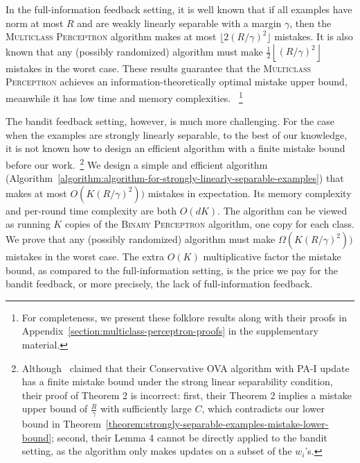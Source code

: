 In the full-information feedback setting, it is well known
\citep{Crammer-Singer-2003} that if all examples have norm at most $R$ and are
weakly linearly separable with a margin $\gamma$, then the \textsc{Multiclass
Perceptron} algorithm makes at most $\lfloor 2(R/\gamma)^2 \rfloor$ mistakes.
It is also known that any (possibly randomized) algorithm must
make $\frac{1}{2} \left\lfloor (R/\gamma)^2 \right \rfloor$ mistakes in the
worst case.
These results guarantee that the \textsc{Multiclass Perceptron} achieves an
information-theoretically optimal mistake upper bound, meanwhile it has
low time and memory complexities.%
~\footnote{
For completeness, we present these 
folklore
results along
with their proofs in Appendix~\ref{section:multiclass-perceptron-proofs} in the
supplementary material.}

The bandit feedback setting, however, is much more challenging. For the case
when the examples are strongly linearly separable, to the best of our knowledge,
it is not known how to design an efficient algorithm with a finite mistake bound
before our work.~\footnote{Although~\cite{Chen-Chen-Zhang-Chen-Zhang-2009}
claimed that their Conservative OVA algorithm with PA-I update has a finite
mistake bound under the strong linear separability condition, their proof of
Theorem 2 is incorrect: first, their Theorem 2
implies a mistake upper bound of $\frac{R}{\gamma}$ with
sufficiently large $C$, which contradicts our lower
bound in Theorem~\ref{theorem:strongly-separable-examples-mistake-lower-bound};
second, their Lemma 4 cannot be directly applied to the bandit
setting, as the algorithm only makes updates on a subset of the $w_i$'s.} We
design a simple and efficient algorithm
(Algorithm~\ref{algorithm:algorithm-for-strongly-linearly-separable-examples})
that makes at most $O(K (R/\gamma)^2))$ mistakes in expectation. Its memory
complexity and per-round time complexity are both $O(dK)$. The algorithm can be
viewed as running $K$ copies of the \textsc{Binary Perceptron} algorithm, one
copy for each class. We prove that any (possibly randomized) algorithm must make
$\Omega(K (R/\gamma)^2))$ mistakes in the worst case. The extra $O(K)$
multiplicative factor the mistake bound, as compared to the full-information
setting, is the price we pay for the bandit feedback, or more precisely, the
lack of full-information feedback.

